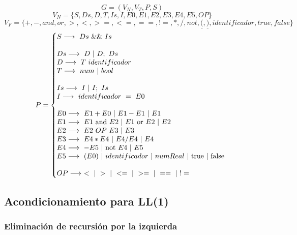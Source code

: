 $$G = (V_N, V_T, P, S)$$
$$V_N = \{S, Ds, D, T, Is, I, E0, E1, E2, E3, E4, E5, OP\}$$
$$V_F = \{+, -, and, or, >, <, >=, <=, ==, !=, *, /, not, \underline{(}, \underline{)}, identificador, true, false\}$$
\begin{equation*}P =\left\{
\begin{array}{@{}ll@{}}
S \longrightarrow\ Ds\ \&\&\ Is\\
\\
Ds \longrightarrow\ D\ |\ D;\ Ds\\
D \longrightarrow\ T\ identificador\\
T \longrightarrow\ num\ |\ bool\\
\\
Is \longrightarrow\ I\ |\ I;\ Is\\
I \longrightarrow\ identificador\ =\ E0\\
\\
E0 \longrightarrow\ E1 + E0\ |\ E1 - E1\ |\ E1\\
E1 \longrightarrow\ E1\ \text{and}\ E2\ |\ E1\ \text{or}\ E2\ |\ E2\\
E2 \longrightarrow\ E2\ OP\ E3\ |\ E3\\
E3 \longrightarrow\ E4 * E4\ |\ E4 / E4\ |\ E4\\
E4 \longrightarrow\ -E5\ |\ \text{not}\ E4\ |\ E5\\
E5 \longrightarrow\ (E0)\ |\ identificador\ |\ numReal\ |\ \text{true}\ |\ \text{false}\\
\\
OP \longrightarrow\ <\ |\ >\ |\ <=\ |\ >=\ |\ ==\ |\ !=\\
\end{array}
\right .
\end{equation*}

\newpage
\subsection{Acondicionamiento para LL(1)}
\subsubsection{Eliminación de recursión por la izquierda}

